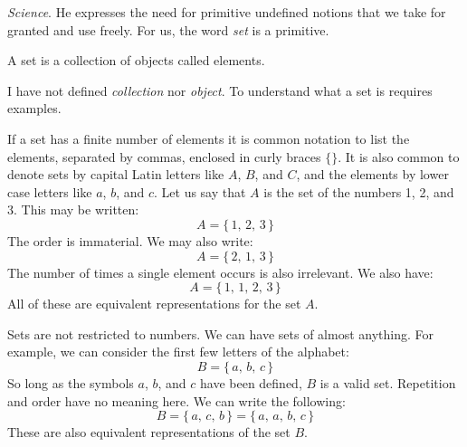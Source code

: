         \textit{Science}. He expresses the need for primitive
        undefined notions that we take for granted and use freely. For us, the
        word \textit{set} is a primitive.
        \begin{definition}
            A \gls{set} is a collection of objects called elements.
        \end{definition}
        I have not defined \textit{collection} nor \textit{object}. To
        understand what a set is requires examples.
        \begin{example}
            If a set has a finite number of
            elements it is common notation to list the elements, separated by
            commas, enclosed in curly braces $\{\}$. It is also common to
            denote sets by capital Latin letters like $A$, $B$, and $C$, and
            the elements by lower case letters like $a$, $b$, and $c$. Let us
            say that $A$ is the set of the numbers 1, 2, and 3.
            This may be written:
            \begin{equation}
                A=\{\,1,\,2,\,3\,\}
            \end{equation}
            The order is immaterial. We may also write:
            \begin{equation}
                A=\{\,2,\,1,\,3\,\}
            \end{equation}
            The number of times a single element occurs is also irrelevant. We
            also have:
            \begin{equation}
                A=\{\,1,\,1,\,2,\,3\,\}
            \end{equation}
            All of these are equivalent representations for the set $A$.
        \end{example}
        \begin{example}
            Sets are not restricted to numbers. We can have sets of almost
            anything. For example, we can consider the first few letters of
            the alphabet:
            \begin{equation}
                B=\{\,a,\,b,\,c\,\}
            \end{equation}
            So long as the symbols $a$, $b$, and $c$ have been defined, $B$ is
            a valid set. Repetition and order have no meaning here. We can write
            the following:
            \begin{equation}
                B=\{\,a,\,c,\,b\,\}=\{\,a,\,a,\,b,\,c\,\}
            \end{equation}
            These are also equivalent representations of the set $B$.
        \end{example}
